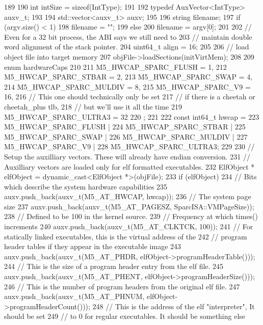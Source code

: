\begin{DoxyCode}
189 {
190     int intSize = sizeof(IntType);
191 
192     typedef AuxVector<IntType> auxv_t;
193 
194     std::vector<auxv_t> auxv;
195 
196     string filename;
197     if (argv.size() < 1)
198         filename = "";
199     else
200         filename = argv[0];
201 
202     // Even for a 32 bit process, the ABI says we still need to
203     // maintain double word alignment of the stack pointer.
204     uint64_t align = 16;
205 
206     // load object file into target memory
207     objFile->loadSections(initVirtMem);
208 
209     enum hardwareCaps
210     {
211         M5_HWCAP_SPARC_FLUSH = 1,
212         M5_HWCAP_SPARC_STBAR = 2,
213         M5_HWCAP_SPARC_SWAP = 4,
214         M5_HWCAP_SPARC_MULDIV = 8,
215         M5_HWCAP_SPARC_V9 = 16,
216         // This one should technically only be set
217         // if there is a cheetah or cheetah_plus tlb,
218         // but we'll use it all the time
219         M5_HWCAP_SPARC_ULTRA3 = 32
220     };
221 
222     const int64_t hwcap =
223         M5_HWCAP_SPARC_FLUSH |
224         M5_HWCAP_SPARC_STBAR |
225         M5_HWCAP_SPARC_SWAP |
226         M5_HWCAP_SPARC_MULDIV |
227         M5_HWCAP_SPARC_V9 |
228         M5_HWCAP_SPARC_ULTRA3;
229 
230     // Setup the auxilliary vectors. These will already have endian conversion.
231     // Auxilliary vectors are loaded only for elf formatted executables.
232     ElfObject * elfObject = dynamic_cast<ElfObject *>(objFile);
233     if (elfObject) {
234         // Bits which describe the system hardware capabilities
235         auxv.push_back(auxv_t(M5_AT_HWCAP, hwcap));
236         // The system page size
237         auxv.push_back(auxv_t(M5_AT_PAGESZ, SparcISA::VMPageSize));
238         // Defined to be 100 in the kernel source.
239         // Frequency at which times() increments
240         auxv.push_back(auxv_t(M5_AT_CLKTCK, 100));
241         // For statically linked executables, this is the virtual address of the
242         // program header tables if they appear in the executable image
243         auxv.push_back(auxv_t(M5_AT_PHDR, elfObject->programHeaderTable()));
244         // This is the size of a program header entry from the elf file.
245         auxv.push_back(auxv_t(M5_AT_PHENT, elfObject->programHeaderSize()));
246         // This is the number of program headers from the original elf file.
247         auxv.push_back(auxv_t(M5_AT_PHNUM, elfObject->programHeaderCount()));
248         // This is the address of the elf "interpreter", It should be set
249         // to 0 for regular executables. It should be something else
}}
\end{DoxyCode}
